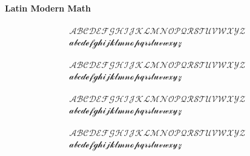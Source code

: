 \documentclass{article}
\begin{document}
\paragraph{Latin Modern Math}
\begin{align}
    \mathscr{ABCDEFGHIJKLMNOPQRSTUVWXYZ} \\
    \mathscr{abcdefghijklmnopqrstuvwxyz}
\end{align}

\begin{align}
    \mathscr{ABCDEFGHIJKLMNOPQRSTUVWXYZ} \\
    \mathscr{abcdefghijklmnopqrstuvwxyz}    
\end{align}

\begin{align}
    \mathscr{ABCDEFGHIJKLMNOPQRSTUVWXYZ} \\
    \mathscr{abcdefghijklmnopqrstuvwxyz}  
\end{align}

\begin{align}
    \mathscr{ABCDEFGHIJKLMNOPQRSTUVWXYZ} \\
    \mathscr{abcdefghijklmnopqrstuvwxyz}
\end{align}
\end{document}
